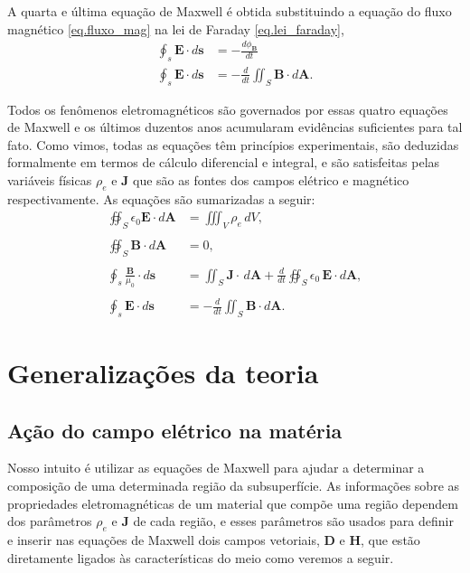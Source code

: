 A quarta e última equação de Maxwell é obtida substituindo a equação do fluxo magnético \ref{eq.fluxo_mag} na lei de Faraday \ref{eq.lei_faraday},
\begin{align*}
\oint_s\mathbf{E}\cdot d\mathbf{s}&=-\frac{d\phi_\mathbf{B}}{dt}\\
\oint_s\mathbf{E}\cdot d\mathbf{s}&=-\frac{d}{dt}\iint_S\mathbf{B}\cdot d\mathbf{A}.
\end{align*}

Todos os fenômenos eletromagnéticos são governados por essas quatro equações de Maxwell  e os últimos duzentos anos acumularam evidências suficientes para tal fato. Como vimos, todas as equações têm princípios experimentais, são deduzidas formalmente em termos de cálculo diferencial e integral, e são satisfeitas pelas variáveis físicas $\rho_e$ e $\mathbf{J}$ que são as fontes dos campos elétrico e magnético respectivamente. As equações são sumarizadas a seguir:
\begin{align}\label{eq.maxwell_1}
\oiint_S\epsilon_0\textbf{E}\cdot\textit{d}\textbf{A}&=\iiint_{V}\rho_e\,dV,\\\nonumber\\\label{eq.maxwell_2}
\oiint_S\textbf{B}\cdot\textit{d}\textbf{A}&=0,\\\nonumber\\\label{eq.maxwell_3}
\oint_s\frac{\mathbf{B}}{\mu_0}\cdot d\mathbf{s}&=\iint_S\mathbf{J}\cdot\,d\mathbf{A}+\frac{d}{dt}\oiint_S\epsilon_0\,\textbf{E}\cdot\textit{d}\textbf{A},\\\nonumber\\\label{eq.maxwell_4}
\oint_s\mathbf{E}\cdot d\mathbf{s}&=-\frac{d}{dt}\iint_S\mathbf{B}\cdot d\mathbf{A}.
\end{align}

\section{Generalizações da teoria}\label{sec.magnetizacao_polarizacao}

\subsection{Ação do campo elétrico na matéria}

Nosso intuito é utilizar as equações de Maxwell para ajudar a determinar a composição de uma determinada região da subsuperfície. As informa\c{c}\~oes sobre as propriedades eletromagnéticas de um material que compõe uma região dependem dos parâmetros $\rho_e$ e $\mathbf{J}$ de cada região, e esses parâmetros são usados para definir e inserir nas equações de Maxwell dois campos vetoriais, $\mathbf{D}$ e $\mathbf{H}$, que estão diretamente ligados às características do meio como veremos a seguir.

